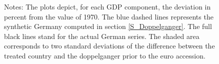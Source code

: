\documentclass[12pt]{article}
\newcommand{\annote}[1]{\parbox{\textwidth}{\renewcommand{\baselinestretch}{1.0}\vspace{12pt} \small Notes: #1}}
\begin{document}
\begin{figure}[h!]
    \annote{The plots depict, for each GDP component, the deviation in percent from the value of 1970. The blue dashed lines represents the synthetic Germany computed in section \ref{S_Doppelganger}. The full black lines stand for the actual German series. The shaded area corresponds to two standard deviations of the difference between the treated country and the doppelganger prior to the euro accession. }
\end{figure}
\end{document}
